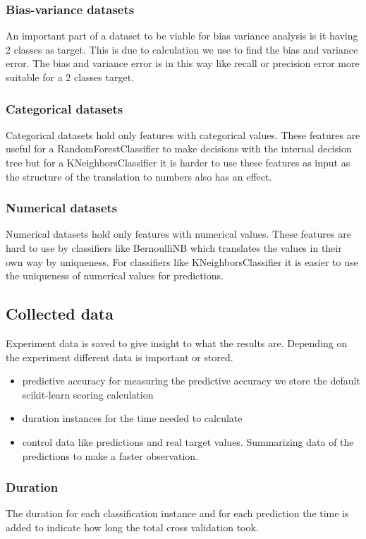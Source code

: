 \documentclass[a4paper,10pt]{article}
\begin{document}
\subsubsection{Bias-variance datasets}
An important part of a dataset to be viable for bias variance analysis is it having 2 classes as target. This is due to calculation we use to find the bias and variance error. The bias and variance error is in this way like recall or precision error more suitable for a 2 classes target.  %
\subsubsection{Categorical datasets}
Categorical datasets hold only features with categorical values. These features are useful for a RandomForestClassifier to make decisions with the internal decision tree but for a KNeighborsClassifier it is harder to use these features as input as the structure of the translation to numbers also has an effect.
\subsubsection{Numerical datasets}
Numerical datasets hold only features with numerical values. These features are hard to use by classifiers like BernoulliNB which translates the values in their own way by uniqueness. For classifiers like KNeighborsClassifier it is easier to use the uniqueness of numerical values for predictions.

\subsection{Collected data}
Experiment data is saved to give insight to what the results are. Depending on the experiment different data is important or stored. 
\begin{itemize}
	\item predictive accuracy for measuring the predictive accuracy we store the default scikit-learn scoring calculation
	\item duration instances for the time needed to calculate 
	\item control data like predictions and real target values. Summarizing data of the predictions to make a faster observation. 
\end{itemize}
\subsubsection{Duration}
The duration for each classification instance and for each prediction the time is added to indicate how long the total cross validation took. 
\end{document}
